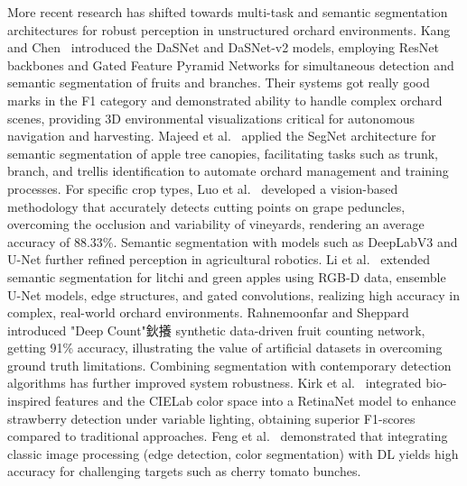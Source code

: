 \documentclass[a4paper,fleqn]{cas-dc}
\begin{document}
More recent research has shifted towards multi-task and semantic segmentation architectures for robust perception in unstructured orchard environments. Kang and Chen~\cite{kang2019fruit, kang2020fruit} introduced the DaSNet and DaSNet-v2 models, employing ResNet backbones and Gated Feature Pyramid Networks for simultaneous detection and semantic segmentation of fruits and branches. Their systems got really good marks in the F1 category and demonstrated ability to handle complex orchard scenes, providing 3D environmental visualizations critical for autonomous navigation and harvesting. Majeed et al.~\cite{majeed2020deep} applied the SegNet architecture for semantic segmentation of apple tree canopies, facilitating tasks such as trunk, branch, and trellis identification to automate orchard management and training processes.
For specific crop types, 
Luo et al.~\cite{luo2018vision} developed a vision-based methodology that accurately detects cutting points on grape peduncles, overcoming the occlusion and variability of vineyards, rendering an average accuracy of 88.33\%.
Semantic segmentation with models such as DeepLabV3 and U-Net further refined perception in agricultural robotics. 
Li et al.~\cite{li2020detection, li2021novel} extended semantic segmentation for litchi and green apples using RGB-D data, ensemble U-Net models, edge structures, and gated convolutions, realizing high accuracy in complex, real-world orchard environments.
Rahnemoonfar and Sheppard~\cite{rahnemoonfar2017deep} introduced "Deep Count"鈥攁 synthetic data-driven fruit counting network, getting 91\% accuracy, illustrating the value of artificial datasets in overcoming ground truth limitations.
Combining segmentation with contemporary detection algorithms has further improved system robustness. 
Kirk et al.~\cite{kirk2020b} integrated bio-inspired features and the CIELab color space into a RetinaNet model to enhance strawberry detection under variable lighting, obtaining superior F1-scores compared to traditional approaches. 
Feng et al.~\cite{feng2018} demonstrated that integrating classic image processing (edge detection, color segmentation) with DL yields high accuracy for challenging targets such as cherry tomato bunches.
\end{document}
